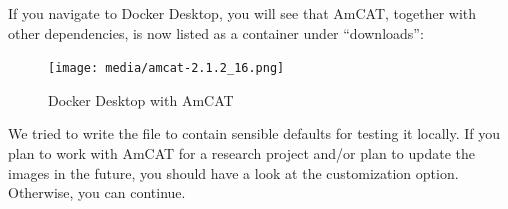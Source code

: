 \documentclass[
  letterpaper,
  DIV=11,
  numbers=noendperiod]{scrreprt}
\begin{document}
If you navigate to Docker Desktop, you will see that AmCAT, together
with other dependencies, is now listed as a container under
``downloads'':

\begin{figure}[H]

{\centering \texttt{[image: media/amcat-2.1.2\_16.png]}

}

\caption{Docker Desktop with AmCAT}

\end{figure}%

We tried to write the file to contain sensible defaults for testing it
locally. If you plan to work with AmCAT for a research project and/or
plan to update the images in the future, you should have a look at the
customization option. Otherwise, you can continue.
\end{document}
